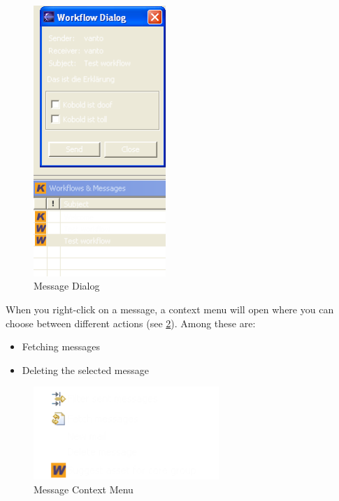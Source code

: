 \begin{figure}[h!]
\begin{center}
\includegraphics[width=5cm]{workflowdialog.png}
   \caption{Message Dialog}
\label{workflowdialog}
\end{center}
\end{figure}\par

When you right-click on a message, a context menu will open where you can choose 
between different actions (see \ref{workflowkontext}). Among these are:

\begin{itemize}
	\item Fetching messages
	\item Deleting the selected message
\end{itemize}

\begin{figure}[h!]
\begin{center}
\includegraphics[width=7cm]{workflowkontext.png}
   \caption{Message Context Menu}
\label{workflowkontext}
\end{center}
\end{figure}\par

